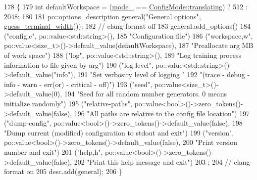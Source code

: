 \begin{DoxyCode}
178                                                                \{
179   \textcolor{keywordtype}{int} defaultWorkspace = (\hyperlink{classmarian_1_1ConfigParser_ae3bb2ffc2601222cc53734a60ab1f980}{mode\_} == \hyperlink{namespacemarian_aaddd4b008ff5352b1fe7e16574f7e1f9a5143d2bebfe7a6b9c7050a8f6bf53e2b}{ConfigMode::translating}) ? 512 : 2048;
180 
181   po::options\_description general(\textcolor{stringliteral}{"General options"}, \hyperlink{namespacemarian_aa656da9ccb3e53462fef9b9745616b57}{guess\_terminal\_width}());
182   \textcolor{comment}{// clang-format off}
183   general.add\_options()
184     (\textcolor{stringliteral}{"config,c"}, po::value<std::string>(),
185      \textcolor{stringliteral}{"Configuration file"})
186     (\textcolor{stringliteral}{"workspace,w"}, po::value<size\_t>()->default\_value(defaultWorkspace),
187       \textcolor{stringliteral}{"Preallocate  arg  MB of work space"})
188     (\textcolor{stringliteral}{"log"}, po::value<std::string>(),
189      \textcolor{stringliteral}{"Log training process information to file given by  arg"})
190     (\textcolor{stringliteral}{"log-level"}, po::value<std::string>()->default\_value(\textcolor{stringliteral}{"info"}),
191      \textcolor{stringliteral}{"Set verbosity level of logging "}
192      \textcolor{stringliteral}{"(trace - debug - info - warn - err(or) - critical - off)"})
193     (\textcolor{stringliteral}{"seed"}, po::value<size\_t>()->default\_value(0),
194      \textcolor{stringliteral}{"Seed for all random number generators. 0 means initialize randomly"})
195     (\textcolor{stringliteral}{"relative-paths"}, po::value<bool>()->zero\_tokens()->default\_value(\textcolor{keyword}{false}),
196      \textcolor{stringliteral}{"All paths are relative to the config file location"})
197     (\textcolor{stringliteral}{"dump-config"}, po::value<bool>()->zero\_tokens()->default\_value(\textcolor{keyword}{false}),
198      \textcolor{stringliteral}{"Dump current (modified) configuration to stdout and exit"})
199     (\textcolor{stringliteral}{"version"}, po::value<bool>()->zero\_tokens()->default\_value(\textcolor{keyword}{false}),
200       \textcolor{stringliteral}{"Print version number and exit"})
201     (\textcolor{stringliteral}{"help,h"}, po::value<bool>()->zero\_tokens()->default\_value(\textcolor{keyword}{false}),
202       \textcolor{stringliteral}{"Print this help message and exit"})
203   ;
204   \textcolor{comment}{// clang-format on}
205   desc.add(general);
206 \}
\end{DoxyCode}


